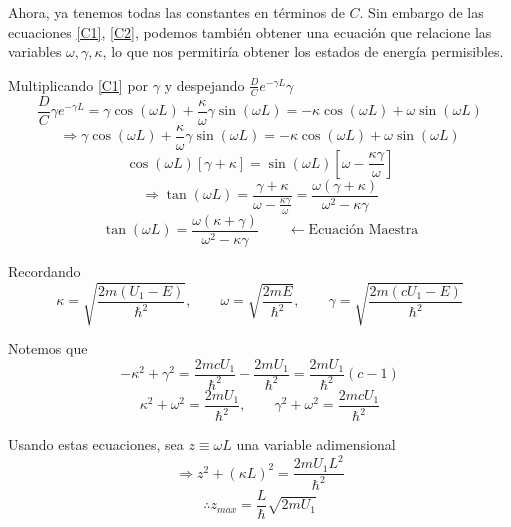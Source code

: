 Ahora, ya tenemos todas las constantes en términos de $C$. Sin embargo de las ecuaciones \ref{C1}, \ref{C2}, podemos también obtener una ecuación que relacione las variables $\omega, \gamma, \kappa$, lo que nos permitiría obtener los estados de energía permisibles.

Multiplicando \ref{C1} por $\gamma$ y despejando $\frac{D}{C}e^{-\gamma L}\gamma$
\begin{equation*}
\frac{D}{C}\gamma e^{-\gamma L} = \gamma\cos(\omega L) + \frac{\kappa}{\omega}\gamma\sin(\omega L) = -\kappa\cos(\omega L) + \omega\sin(\omega L)
\end{equation*}
\begin{equation*}
\Rightarrow \gamma\cos(\omega L) + \frac{\kappa}{\omega}\gamma\sin(\omega L) = -\kappa\cos(\omega L) + \omega\sin(\omega L)
\end{equation*}
\begin{equation*}
\cos(\omega L)\left[\gamma + \kappa\right] = \sin(\omega L)\left[\omega - \frac{\kappa\gamma}{\omega}\right]
\end{equation*}
\begin{equation*}
\Rightarrow \tan(\omega L) = \frac{\gamma + \kappa}{\omega - \frac{\kappa\gamma}{\omega}} = \frac{\omega(\gamma+\kappa)}{\omega^2 - \kappa\gamma}
\end{equation*}
\begin{equation}
\boxed{\tan(\omega L) = \frac{\omega(\kappa+\gamma)}{\omega^2 - \kappa\gamma}} \qquad \leftarrow \text{Ecuación Maestra}
\end{equation}

Recordando
\begin{equation*}
\kappa = \sqrt{\frac{2m(U_1-E)}{\hbar^2}}, \qquad \omega = \sqrt{\frac{2mE}{\hbar^2}}, \qquad \gamma = \sqrt{\frac{2m(cU_1-E)}{\hbar^2}}
\end{equation*}

Notemos que
\begin{equation*}
-\kappa^2 + \gamma^2 = \frac{2mcU_1}{\hbar^2} - \frac{2mU_1}{\hbar^2} = \frac{2mU_1}{\hbar^2}(c-1)
\end{equation*}
\begin{equation*}
\kappa^2 + \omega^2 = \frac{2mU_1}{\hbar^2}, \qquad \gamma^2 + \omega^2 = \frac{2mcU_1}{\hbar^2}
\end{equation*}

Usando estas ecuaciones, sea $z \equiv \omega L$ una variable adimensional
\begin{equation*}
\Rightarrow z^2 + (\kappa L)^2 = \frac{2mU_1L^2}{\hbar^2}
\end{equation*}
\begin{equation*}
\therefore z_{max} = \frac{L}{\hbar}\sqrt{2mU_1}
\end{equation*}

